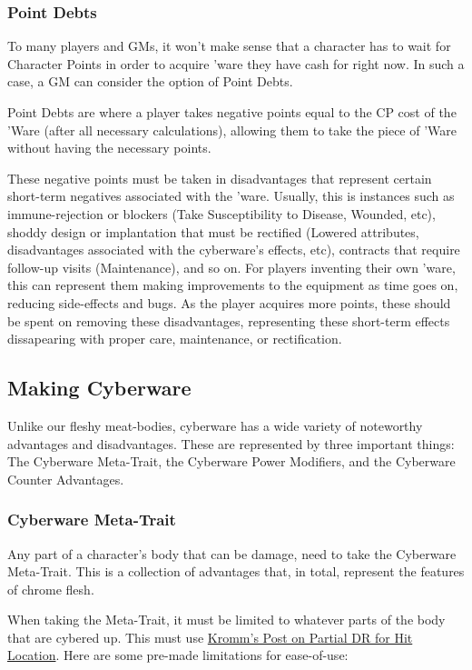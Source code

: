 \begin{multicols*}{3}
	\subsubsection{Point Debts}
	
	To many players and GMs, it won't make sense that a character has to wait for Character Points in order to acquire 'ware they have cash for right now. In such a case, a GM can consider the option of Point Debts.
	
	Point Debts are where a player takes negative points equal to the CP cost of the 'Ware (after all necessary calculations), allowing them to take the piece of 'Ware without having the necessary points. 
	
	These negative points must be taken in disadvantages that represent certain short-term negatives associated with the 'ware. Usually, this is instances such as immune-rejection or blockers (Take Susceptibility to Disease, Wounded, etc), shoddy design or implantation that must be rectified (Lowered attributes, disadvantages associated with the cyberware's effects, etc), contracts that require follow-up visits (Maintenance), and so on. For players inventing their own 'ware, this can represent them making improvements to the equipment as time goes on, reducing side-effects and bugs. As the player acquires more points, these should be spent on removing these disadvantages, representing these short-term effects dissapearing with proper care, maintenance, or rectification.
	
	\subsection{Making Cyberware}
	
	Unlike our fleshy meat-bodies, cyberware has a wide variety of noteworthy advantages and disadvantages. These are represented by three important things: The Cyberware Meta-Trait, the Cyberware Power Modifiers, and the Cyberware Counter Advantages.
	
	\subsubsection{Cyberware Meta-Trait}\label{cyberware-meta-trait}
	
	Any part of a character's body that can be damage, need to take the Cyberware Meta-Trait. This is a collection of advantages that, in total, represent the features of chrome flesh.
	
	When taking the Meta-Trait, it must be limited to whatever parts of the body that are cybered up. This must use \textcolor{Blue}{\href{http://forums.sjgames.com/showpost.php?p=623207&postcount=1}{Kromm's Post on Partial DR for Hit Location}}. Here are some pre-made limitations for ease-of-use:
	

\end{multicols*}

